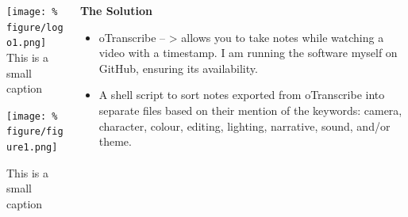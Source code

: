 \documentclass[unknownkeysallowed,usepdftitle=false, parskip=full]{beamer}
\newcommand{\secvariable}{nothing}
\begin{document}
\begin{frame}\label{\secvariable}
  \begin{columns}[t]
  \begin{column}[c]{0.45\textwidth}
\texttt{[image: \%
figure/logo1.png]}\\
\tiny{This is a small caption}

\vspace{12pt}
\texttt{[image: \%
figure/figure1.png]}

\tiny{This is a small caption}
    \end{column}
    \begin{column}[c]{0.45\textwidth}
    \parbox{\linewidth}{
    
        \textbf{The Solution}

\vspace{1pt}

      \begin{itemize}
          \item \small{oTranscribe -- \textgreater{} allows you to take notes while watching a video with a timestamp. I am running the software myself on GitHub, ensuring its availability.}
      \end{itemize}
      \begin{itemize}
          \item \small{A shell script to sort notes exported from oTranscribe into separate files based on their mention of the keywords: camera, character, colour, editing, lighting, narrative, sound, and/or theme.}
      \end{itemize}
      }
    \end{column}
    
  \end{columns}

  
\end{frame}
\end{document}
